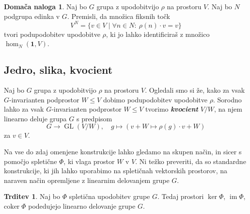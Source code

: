 \documentclass[11pt]{book}
\def\11{\mathbf{1}}
\DeclareMathOperator\image{im}
\DeclareMathOperator\GL{GL}
\def\definicija{\color{rdeca}\bf\em}
\theoremstyle{definition}
\theoremstyle{zgled}
\theoremstyle{odprtproblem}
\theoremstyle{domacanaloga}
\newtheorem*{domacanaloga}{Domača naloga}
\theoremstyle{izrek}
\newtheorem*{trditev}{Trditev}
\begin{document}
\begin{domacanaloga}
    Naj bo $G$ grupa z upodobitvijo $\rho$ na prostoru $V$. Naj bo $N$ podgrupa edinka v $G$. Premisli, da množica fiksnih točk
    \[
        V^N = \{ v \in V \mid \forall n \in N \colon \ \rho(n) \cdot v = v \}
    \]
    tvori podupodobitev upodobitve $\rho$, ki jo lahko identificiraš z množico $\hom_N(\11, V)$. 
\end{domacanaloga}

\subsection{Jedro, slika, kvocient}

Naj bo $G$ grupa z upodobitvijo $\rho$ na prostoru $V$. Ogledali smo si že, kako za vsak $G$-invarianten podprostor $W \leq V$ dobimo podupodobitev upodobitve $\rho$. Sorodno lahko za vsak $G$-invarianten podprostor $W \leq V$ tvorimo {\definicija kvocient} $V/W$, na njem linearno deluje grupa $G$ s predpisom
\[
    G \to \GL(V/W), \quad
    g \mapsto \left( v + W \mapsto \rho(g) \cdot v + W \right)
\]
za $v \in V$.

Na vse do zdaj omenjene konstrukcije lahko gledamo na skupen način, in sicer s pomočjo spletične $\Phi$, ki vlaga prostor $W$ v $V$. Ni težko preveriti, da so standardne konstrukcije, ki jih lahko uporabimo na spletičnah vektorskih prostorov, na naraven način opremljene z linearnim delovanjem grupe $G$.

\begin{trditev}
Naj bo $\Phi$ spletična upodobitev grupe $G$. Tedaj prostori $\ker \Phi$, $\image \Phi$, $\mathrm{coker} \; \Phi$ podedujejo linearno delovanje grupe $G$.
\end{trditev}
\end{document}
